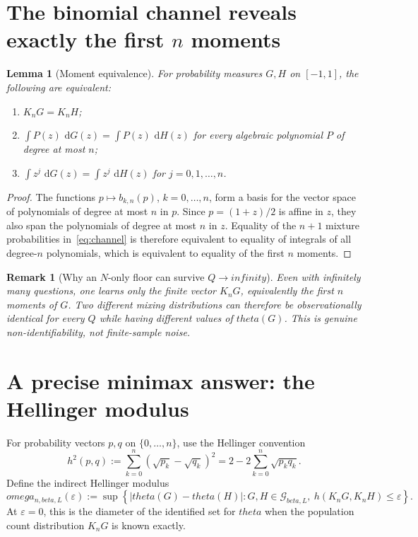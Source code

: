 \documentclass[11pt]{article}
\def\beta{beta}%
\def\theta{theta}%
\def\omega{omega}%
\def\infty{infinity}%
\newtheorem{lemma}[theorem]{Lemma}
\newtheorem{remark}[theorem]{Remark}
\newcommand{\calG}{\mathcal G}
\newcommand{\eps}{\varepsilon}
\newcommand{\dd}{\,\mathrm d}
\begin{document}
\section{The binomial channel reveals exactly the first $n$ moments}

\begin{lemma}[Moment equivalence]
\label{lem:moment-equivalence}
For probability measures $G,H$ on $[-1,1]$, the following are equivalent:
\begin{enumerate}[label=(\alph*)]
\item $K_nG=K_nH$;
\item $\int P(z)\,\dd G(z)=\int P(z)\,\dd H(z)$ for every algebraic polynomial $P$ of degree at most $n$;
\item $\int z^j\,\dd G(z)=\int z^j\,\dd H(z)$ for $j=0,1,\dots,n$.
\end{enumerate}
\end{lemma}

\begin{proof}
The functions $p\mapsto b_{k,n}(p)$, $k=0,\dots,n$, form a basis for the vector space of polynomials of degree at most $n$ in $p$.  Since $p=(1+z)/2$ is affine in $z$, they also span the polynomials of degree at most $n$ in $z$.  Equality of the $n+1$ mixture probabilities in~\eqref{eq:channel} is therefore equivalent to equality of integrals of all degree-$n$ polynomials, which is equivalent to equality of the first $n$ moments.
\end{proof}

\begin{remark}[Why an $N$-only floor can survive $Q\to\infty$]
Even with infinitely many questions, one learns only the finite vector $K_nG$, equivalently the first $n$ moments of $G$.  Two different mixing distributions can therefore be observationally identical for every $Q$ while having different values of $\theta(G)$.  This is genuine non-identifiability, not finite-sample noise.
\end{remark}

\section{A precise minimax answer: the Hellinger modulus}

For probability vectors $p,q$ on $\{0,\dots,n\}$, use the Hellinger convention
\begin{equation}
\label{eq:hellinger}
h^2(p,q)
:=
\sum_{k=0}^n(\sqrt{p_k}-\sqrt{q_k})^2
=2-2\sum_{k=0}^n\sqrt{p_kq_k}.
\end{equation}
Define the indirect Hellinger modulus
\begin{equation}
\label{eq:modulus}
\omega_{n,\beta,L}(\eps)
:=
\sup\left\{
|\theta(G)-\theta(H)|:
G,H\in\calG_{\beta,L},
\ h(K_nG,K_nH)\le\eps
\right\}.
\end{equation}
At $\eps=0$, this is the diameter of the identified set for $\theta$ when the population count distribution $K_nG$ is known exactly.
\end{document}
